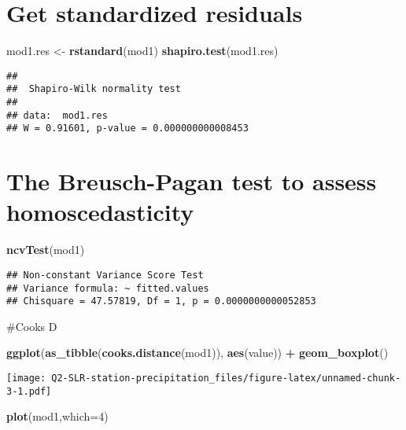 \documentclass[
]{article}
\newenvironment{Shaded}{\begin{snugshade}}{\end{snugshade}}
\newcommand{\AttributeTok}[1]{\textcolor[rgb]{0.13,0.29,0.53}{#1}}
\newcommand{\DecValTok}[1]{\textcolor[rgb]{0.00,0.00,0.81}{#1}}
\newcommand{\FunctionTok}[1]{\textcolor[rgb]{0.13,0.29,0.53}{\textbf{#1}}}
\newcommand{\NormalTok}[1]{#1}
\newcommand{\OtherTok}[1]{\textcolor[rgb]{0.56,0.35,0.01}{#1}}
\newcommand{\SpecialCharTok}[1]{\textcolor[rgb]{0.81,0.36,0.00}{\textbf{#1}}}
\begin{document}
\section{Get standardized residuals}\label{get-standardized-residuals}

\begin{Shaded}
\begin{Highlighting}[]
\NormalTok{mod1.res }\OtherTok{\textless{}{-}} \FunctionTok{rstandard}\NormalTok{(mod1)}
\FunctionTok{shapiro.test}\NormalTok{(mod1.res)}
\end{Highlighting}
\end{Shaded}

\begin{verbatim}
## 
##  Shapiro-Wilk normality test
## 
## data:  mod1.res
## W = 0.91601, p-value = 0.000000000008453
\end{verbatim}

\section{The Breusch-Pagan test to assess
homoscedasticity}\label{the-breusch-pagan-test-to-assess-homoscedasticity}

\begin{Shaded}
\begin{Highlighting}[]
\FunctionTok{ncvTest}\NormalTok{(mod1)}
\end{Highlighting}
\end{Shaded}

\begin{verbatim}
## Non-constant Variance Score Test 
## Variance formula: ~ fitted.values 
## Chisquare = 47.57819, Df = 1, p = 0.0000000000052853
\end{verbatim}

\#Cooks D

\begin{Shaded}
\begin{Highlighting}[]
\FunctionTok{ggplot}\NormalTok{(}\FunctionTok{as\_tibble}\NormalTok{(}\FunctionTok{cooks.distance}\NormalTok{(mod1)), }\FunctionTok{aes}\NormalTok{(value)) }\SpecialCharTok{+} \FunctionTok{geom\_boxplot}\NormalTok{()}
\end{Highlighting}
\end{Shaded}

\texttt{[image: Q2-SLR-station-precipitation\_files/figure-latex/unnamed-chunk-3-1.pdf]}

\begin{Shaded}
\begin{Highlighting}[]
\FunctionTok{plot}\NormalTok{(mod1,}\AttributeTok{which=}\DecValTok{4}\NormalTok{)}
\end{Highlighting}
\end{Shaded}
\end{document}
